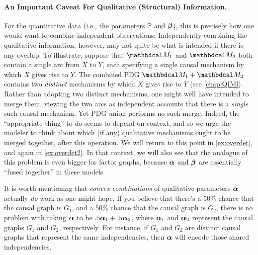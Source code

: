 \paragraph{An Important Caveat For Qualitative (Structural) Information.}
For the quantitative data (i.e., the parameters $\mathbb P$ and $\boldsymbol\beta$), this is precisely how one would want to combine independent observations. 
Independently combining the qualitative information, however, may not quite be what is intended if there is any overlap. 
To illustrate, suppose that $\dg M_1$ and $\dg M_2$ both contain a single arc from $X$ to $Y$,
	each specifying a single causal mechanism by which $X$ gives rise to $Y$.
The combined PDG $\dg M_1 + \dg M_2$ contains two \emph{distinct} mechanisms by which $X$ gives rise to $Y$ (see \cref{chap:QIM}).
Rather than adopting two distinct mechanisms, one might well have intended to merge them, viewing the two arcs as independent accounts that there is a \emph{single} such causal mechanism. 
Yet PDG union performs no such merge.
Indeed, the ``appropriate thing'' to do seems to depend on context, and so we urge the modeler to think about which (if any) qualitative mechanisms ought to be merged together, after this operation. 
We will return to this point in \cref{ex:overdet},
    and again in \cref{ex:overdet2}.
In that context, we will also see that the
	analogue of this problem is even bigger 
    for factor graphs, because 
    $\boldsymbol\alpha$ and $\boldsymbol\beta$ are essentially ``fused together'' in these models.

It is worth mentioning that \emph{convex combinations} of qualitative parameters $\boldsymbol\alpha$ actually \emph{do} work as one might hope. If you believe that there's a 50\% chance that the causal graph is $G_1$, and a 50\% chance that the causal graph is $G_2$, there is no problem with taking $\boldsymbol\alpha$ to be $.5 \boldsymbol\alpha_1 + .5 \boldsymbol\alpha_2$, where $\boldsymbol\alpha_1$ and $\boldsymbol\alpha_2$ represent the causal graphs $G_1$ and $G_2$, respectively.  For instance, if $G_1$ and $G_2$ are distinct causal graphs that represent the same independencies, then $\boldsymbol\alpha$ will encode those shared independencies. 


